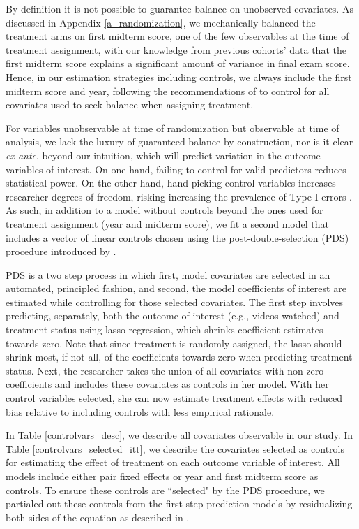 \documentclass[12pt]{article}
\begin{document}
By definition it is not possible to guarantee balance on unobserved covariates. As discussed in Appendix \ref{a_randomization}, we mechanically balanced the treatment arms on first midterm score, one of the few observables at the time of treatment assignment, with our knowledge from previous cohorts' data that the first midterm score explains a significant amount of variance in final exam score. Hence, in our estimation strategies including controls, we always include the first midterm score and year, following the recommendations of \textcite{bm2009} to control for all covariates used to seek balance when assigning treatment.

For variables unobservable at time of randomization but observable at time of analysis, we lack the luxury of guaranteed balance by construction, nor is it clear \textit{ex ante}, beyond our intuition, which will predict variation in the outcome variables of interest. On one hand, failing to control for valid predictors reduces statistical power. On the other hand, hand-picking control variables increases researcher degrees of freedom, risking increasing the prevalence of Type I errors \parencite{sns2011}. As such, in addition to a model without controls beyond the ones used for treatment assignment (year and midterm score), we fit a second model that includes a vector of linear controls chosen using the post-double-selection (PDS) procedure introduced by \textcite{bch2014a}.

PDS is a two step process in which first, model covariates are selected in an automated, principled fashion, and second, the model coefficients of interest are estimated while controlling for those selected covariates. The first step involves predicting, separately, both the outcome of interest (e.g., videos watched) and treatment status using lasso regression, which shrinks coefficient estimates towards zero. Note that since treatment is randomly assigned, the lasso should shrink most, if not all, of the coefficients towards zero when predicting treatment status. Next, the researcher takes the union of all covariates with non-zero coefficients and includes these covariates as controls in her model. With her control variables selected, she can now estimate treatment effects with reduced bias relative to including controls with less empirical rationale.

In Table \ref{controlvars_desc}, we describe all covariates observable in our study. In Table \ref{controlvars_selected_itt}, we describe the covariates selected as controls for estimating the effect of treatment on each outcome variable of interest. All models include either pair fixed effects or year and first midterm score as controls. To ensure these controls are ``selected" by the PDS procedure, we partialed out these controls from the first step prediction models by residualizing both sides of the equation as described in \textcite{bch2014b}.
\end{document}
